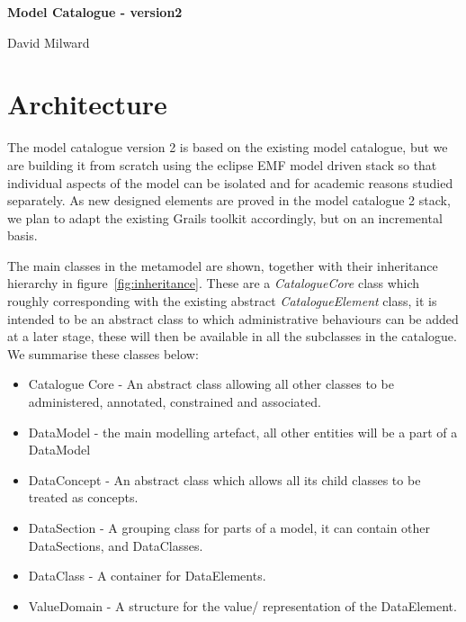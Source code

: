 \documentclass{article}
\begin{document}
 
\bgroup \parindent 0pt
{\Large\textbf{Model Catalogue - version2}}

\vskip 4mm 

{\Large {David Milward}}

\egroup

\vskip 14mm

\noindent

\section{Architecture}

The model catalogue version 2 is based on the existing model catalogue, but we are building it from scratch using the eclipse EMF model driven stack so that individual aspects of the model can be isolated and for academic reasons studied separately. As new designed elements are proved in the model catalogue 2 stack, we plan to adapt the existing Grails toolkit accordingly, but on an incremental basis.

The main classes in the metamodel are shown, together with their inheritance hierarchy in figure~\ref{fig:inheritance}. These are a \emph{CatalogueCore} class which roughly corresponding with the existing abstract \emph{CatalogueElement} class, it is intended to be an abstract class to which administrative behaviours can be added at a later stage, these will then be available in all the subclasses in the catalogue. We summarise these classes below:
\begin{itemize}
\item Catalogue Core - An abstract class allowing all other classes to be administered, annotated, constrained and associated.
\item DataModel - the main modelling artefact, all other entities will be a part of a DataModel
\item DataConcept - An abstract class which allows all its child classes to be treated as concepts.
\item DataSection - A grouping class for parts of a model, it can contain other DataSections, and DataClasses.
\item DataClass - A container for DataElements.
\item ValueDomain - A structure for the value/ representation of the DataElement.
\end{itemize}
\end{document}
